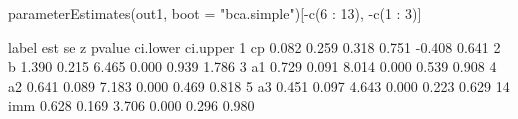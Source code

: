 \begin{Schunk}
\begin{Sinput}
 parameterEstimates(out1, 
                    boot = "bca.simple")[-c(6 : 13), -c(1 : 3)]
\end{Sinput}
\begin{Soutput}
   label   est    se     z pvalue ci.lower ci.upper
1     cp 0.082 0.259 0.318  0.751   -0.408    0.641
2      b 1.390 0.215 6.465  0.000    0.939    1.786
3     a1 0.729 0.091 8.014  0.000    0.539    0.908
4     a2 0.641 0.089 7.183  0.000    0.469    0.818
5     a3 0.451 0.097 4.643  0.000    0.223    0.629
14   imm 0.628 0.169 3.706  0.000    0.296    0.980
\end{Soutput}
\end{Schunk}
